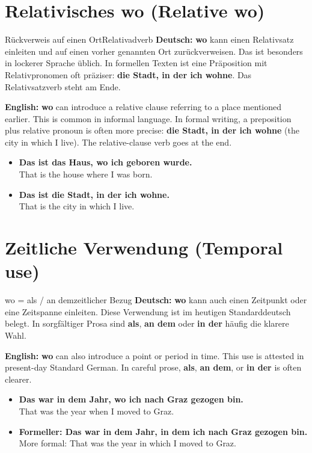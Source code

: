 \documentclass[a4paper,11pt]{article}
\newcommand{\GermanText}[1]{\textbf{Deutsch: }#1\par}
\newcommand{\EnglishText}[1]{{\small\color{SoftGray}\textbf{English: }#1\par}}
\newcommand{\ExampleItem}[2]{\item \textbf{#1}\\{\small\color{SoftGray}#2}}
\begin{document}
\section{Relativisches wo (Relative wo)}
\begin{grammarentry}{Rückverweis auf einen Ort}{Relativadverb}
\GermanText{\textbf{wo} kann einen Relativsatz einleiten und auf einen vorher genannten Ort zurückverweisen. Das ist besonders in lockerer Sprache üblich. In formellen Texten ist eine Präposition mit Relativpronomen oft präziser: \textbf{die Stadt, in der ich wohne}. Das Relativsatzverb steht am Ende.}
\EnglishText{\textbf{wo} can introduce a relative clause referring to a place mentioned earlier. This is common in informal language. In formal writing, a preposition plus relative pronoun is often more precise: \textbf{die Stadt, in der ich wohne} (the city in which I live). The relative-clause verb goes at the end.}
\end{grammarentry}
\begin{exbox}\begin{itemize}
\ExampleItem{Das ist das Haus, wo ich geboren wurde.}{That is the house where I was born.}
\ExampleItem{Das ist die Stadt, in der ich wohne.}{That is the city in which I live.}
\end{itemize}\end{exbox}

\section{Zeitliche Verwendung (Temporal use)}
\begin{grammarentry}{wo = als / an dem}{zeitlicher Bezug}
\GermanText{\textbf{wo} kann auch einen Zeitpunkt oder eine Zeitspanne einleiten. Diese Verwendung ist im heutigen Standarddeutsch belegt. In sorgfältiger Prosa sind \textbf{als}, \textbf{an dem} oder \textbf{in der} häufig die klarere Wahl.}
\EnglishText{\textbf{wo} can also introduce a point or period in time. This use is attested in present-day Standard German. In careful prose, \textbf{als}, \textbf{an dem}, or \textbf{in der} is often clearer.}
\end{grammarentry}
\begin{exbox}\begin{itemize}
\ExampleItem{Das war in dem Jahr, wo ich nach Graz gezogen bin.}{That was the year when I moved to Graz.}
\ExampleItem{Formeller: Das war in dem Jahr, in dem ich nach Graz gezogen bin.}{More formal: That was the year in which I moved to Graz.}
\end{itemize}\end{exbox}
\end{document}
